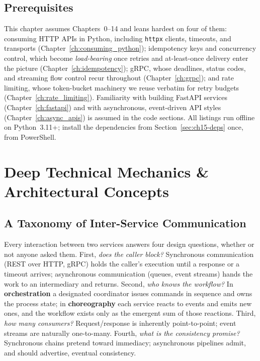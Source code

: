 \subsection*{Prerequisites}
This chapter assumes Chapters~0--14 and leans hardest on four of them:
consuming HTTP APIs in Python, including \texttt{httpx} clients, timeouts,
and transports (Chapter~\ref{ch:consuming_python}); idempotency keys and
concurrency control, which become \emph{load-bearing} once retries and
at-least-once delivery enter the picture (Chapter~\ref{ch:idempotency});
gRPC, whose deadlines, status codes, and streaming flow control recur
throughout (Chapter~\ref{ch:grpc}); and rate limiting, whose token-bucket
machinery we reuse verbatim for retry budgets
(Chapter~\ref{ch:rate_limiting}). Familiarity with building FastAPI
services (Chapter~\ref{ch:fastapi}) and with asynchronous, event-driven API
styles (Chapter~\ref{ch:async_apis}) is assumed in the code sections. All
listings run offline on Python~3.11+; install the dependencies from
Section~\ref{sec:ch15-deps} once, from PowerShell.

\section{Deep Technical Mechanics \& Architectural Concepts}
\label{sec:ch15-mechanics}

\subsection{A Taxonomy of Inter-Service Communication}
\label{subsec:ch15-taxonomy}

Every interaction between two services answers four design questions,
whether or not anyone asked them. First, \emph{does the caller block?}
Synchronous communication (REST over HTTP, gRPC) holds the caller's
execution until a response or a timeout arrives; asynchronous communication
(queues, event streams) hands the work to an intermediary and returns.
Second, \emph{who knows the workflow?} In \textbf{orchestration} a
designated coordinator issues commands in sequence and owns the process
state; in \textbf{choreography} each service reacts to events and emits new
ones, and the workflow exists only as the emergent sum of those reactions.
Third, \emph{how many consumers?} Request/response is inherently
point-to-point; event streams are naturally one-to-many. Fourth,
\emph{what is the consistency promise?} Synchronous chains pretend toward
immediacy; asynchronous pipelines admit, and should advertise, eventual
consistency.

